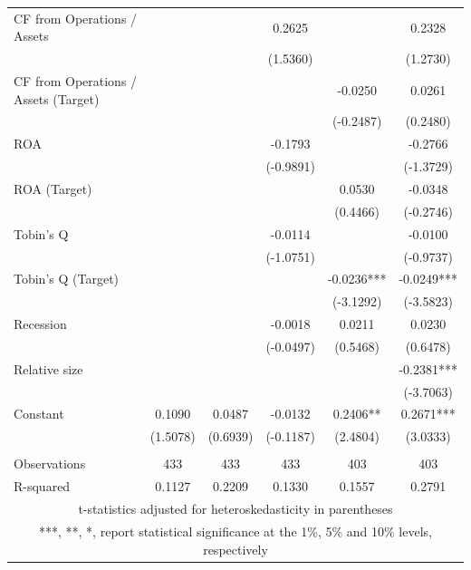 \documentclass[12pt]{article}
\begin{document}
\begin{appendices}
\begin{table}[!htbp]
\begin{adjustbox}{max width=\textwidth}
\begin{tabular}{lccccc}
		   CF from Operations / Assets &  &  & 0.2625 &  & 0.2328 \\
			&  &  & (1.5360) &  & (1.2730) \\
		   CF from Operations / Assets (Target) &  &  &  & -0.0250 & 0.0261 \\
			&  &  &  & (-0.2487) & (0.2480) \\
		   ROA &  &  & -0.1793 &  & -0.2766 \\
			&  &  & (-0.9891) &  & (-1.3729) \\
		   ROA (Target) &  &  &  & 0.0530 & -0.0348 \\
			&  &  &  & (0.4466) & (-0.2746) \\
		   Tobin's Q &  &  & -0.0114 &  & -0.0100 \\
			&  &  & (-1.0751) &  & (-0.9737) \\
		   Tobin's Q (Target) &  &  &  & -0.0236*** & -0.0249*** \\
			&  &  &  & (-3.1292) & (-3.5823) \\
		   Recession &  &  & -0.0018 & 0.0211 & 0.0230 \\
			&  &  & (-0.0497) & (0.5468) & (0.6478) \\
		   Relative size &  &  &  &  & -0.2381*** \\
			&  &  &  &  & (-3.7063) \\
		   Constant & 0.1090 & 0.0487 & -0.0132 & 0.2406** & 0.2671*** \\
			& (1.5078) & (0.6939) & (-0.1187) & (2.4804) & (3.0333) \\
			&  &  &  &  &  \\
		   Observations & 433 & 433 & 433 & 403 & 403 \\
			R-squared & 0.1127 & 0.2209 & 0.1330 & 0.1557 & 0.2791 \\ \hline
			\multicolumn{6}{c}{ t-statistics adjusted for heteroskedasticity in parentheses} \\
			\multicolumn{6}{c}{ ***, **, *, report statistical significance at the 1\%, 5\% and 10\% levels, respectively}\\
		   \end{tabular}		   
	\end{adjustbox}
\end{table}


\end{appendices}
\end{document}

